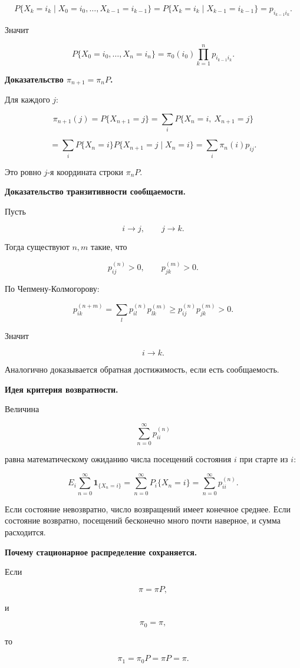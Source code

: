 \documentclass[
  11pt,
  a4paper,
]{article}
\begin{document}
\[
P\{X_k=i_k\mid X_0=i_0,\ldots,X_{k-1}=i_{k-1}\}
=
P\{X_k=i_k\mid X_{k-1}=i_{k-1}\}
=
p_{i_{k-1}i_k}.
\]

Значит

\[
P\{X_0=i_0,\ldots,X_n=i_n\}
=
\pi_0(i_0)\prod_{k=1}^n p_{i_{k-1}i_k}.
\]

\textbf{Доказательство \(\pi_{n+1}=\pi_nP\).}

Для каждого \(j\):

\[
\pi_{n+1}(j)
=
P\{X_{n+1}=j\}
=
\sum_iP\{X_n=i,\ X_{n+1}=j\}
\]

\[
=
\sum_iP\{X_n=i\}P\{X_{n+1}=j\mid X_n=i\}
=
\sum_i\pi_n(i)p_{ij}.
\]

Это ровно \(j\)-я координата строки \(\pi_nP\).

\textbf{Доказательство транзитивности сообщаемости.}

Пусть

\[
i\to j,
\qquad
j\to k.
\]

Тогда существуют \(n,m\) такие, что

\[
p_{ij}^{(n)}>0,
\qquad
p_{jk}^{(m)}>0.
\]

По Чепмену-Колмогорову:

\[
p_{ik}^{(n+m)}
=
\sum_l p_{il}^{(n)}p_{lk}^{(m)}
\ge
p_{ij}^{(n)}p_{jk}^{(m)}
>0.
\]

Значит

\[
i\to k.
\]

Аналогично доказывается обратная достижимость, если есть сообщаемость.

\textbf{Идея критерия возвратности.}

Величина

\[
\sum_{n=0}^{\infty}p_{ii}^{(n)}
\]

равна математическому ожиданию числа посещений состояния \(i\) при
старте из \(i\):

\[
E_i\sum_{n=0}^{\infty}\mathbf 1_{\{X_n=i\}}
=
\sum_{n=0}^{\infty}P_i\{X_n=i\}
=
\sum_{n=0}^{\infty}p_{ii}^{(n)}.
\]

Если состояние невозвратно, число возвращений имеет конечное среднее.
Если состояние возвратно, посещений бесконечно много почти наверное, и
сумма расходится.

\textbf{Почему стационарное распределение сохраняется.}

Если

\[
\pi=\pi P,
\]

и

\[
\pi_0=\pi,
\]

то

\[
\pi_1=\pi_0P=\pi P=\pi.
\]
\end{document}
